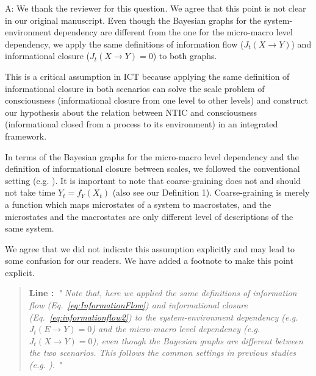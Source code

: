 \documentclass[utf8]{article}
\newenvironment{ans}  
    {\color{Black}\noindent A:}
    {~\newline}
\newcommand{\addnew}[2]{\blockcquote{}{\textbf{Line #1:}~\newline\textit{"#2"}}
}
\begin{document}
    	\begin{ans}
    		We thank the reviewer for this question. We agree that this point is not clear in our original manuscript. Even though the Bayesian graphs for the system-environment dependency are different from the one for the micro-macro level dependency, we apply the same definitions of information flow ($J_{t}(X \rightarrow Y )$) and informational closure ($J_{t}(X \rightarrow Y )=0$) to both graphs. 
    		
    		This is a critical assumption in ICT because applying the same definition of informational closure in both scenarios can solve the scale problem of consciousness (informational closure from one level to other levels) and construct our hypothesis about the relation between NTIC and consciousness (informational closed from a process to its environment) in an integrated framework.
    		
    		In terms of the Bayesian graphs for the micro-macro level dependency and the definition of informational closure between scales, we followed the conventional setting (e.g. \cite{PFANTE.2014}). It is important to note that coarse-graining does not and should not take time $Y_t=f_Y(X_t)$ (also see our Definition 1). Coarse-graining is merely a function which maps microstates of a system to macrostates, and the microstates and the macrostates are only different level of descriptions of the same system.
    		
    		We agree that we did not indicate this assumption explicitly and may lead to some confusion for our readers. We have added a footnote to make this point explicit. 
    		
    		\addnew{}{
    			Note that, here we applied the same definitions of information flow (Eq.~\ref{eq:InformationFlow}) and informational closure (Eq.~\ref{eq:informationflow2}) to the system-environment dependency (e.g. $J_{t}(E \rightarrow Y )=0$) and the micro-macro level dependency (e.g. $J_{t}(X \rightarrow Y )=0$), even though the Bayesian graphs are different between the two scenarios. This follows the common settings in previous studies (e.g. \cite{BERTSCHINGER.2006, PFANTE.2014}).
    		}	
    		
    		
    		

\end{ans}
\end{document}
